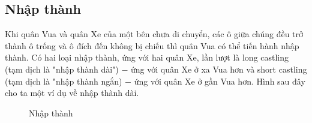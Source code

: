 \subsection{Nhập thành}
Khi quân Vua và quân Xe của một bên chưa di chuyển, các ô giữa chúng đều trở thành ô trống và ô đích đến không bị chiếu thì quân Vua có thể tiến hành nhập thành. Có hai loại nhập thành, ứng với hai quân Xe, lần lượt là long castling (tạm dịch là "nhập thành dài") $-$ ứng với quân Xe ở xa Vua hơn và short castling (tạm dịch là "nhập thành ngắn) $-$ ứng với quân Xe ở gần Vua hơn. Hình sau đây cho ta một ví dụ về nhập thành dài.
\begin{figure}[H]
\caption{Nhập thành}
\end{figure}

